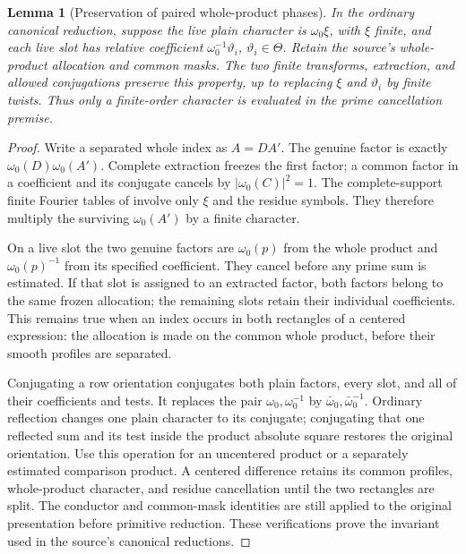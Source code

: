 \documentclass[11pt,a4paper]{article}
\numberwithin{equation}{section}
\newtheorem{lemma}[theorem]{Lemma}
\theoremstyle{definition}
\theoremstyle{remark}
\begin{document}
\begin{lemma}[Preservation of paired whole-product phases]\label{lem:paired-phase-invariant}
In the ordinary canonical reduction, suppose the live plain character
is $\omega_0\xi$, with $\xi$ finite, and each live slot has relative
coefficient $\omega_0^{-1}\vartheta_i$, $\vartheta_i\in\Theta$.
Retain the source's whole-product allocation and common masks.
The two finite transforms, extraction, and allowed conjugations
preserve this property, up to replacing $\xi$ and $\vartheta_i$ by
finite twists.  Thus only a finite-order character is evaluated in
the prime cancellation premise.
\end{lemma}
\begin{proof}
Write a separated whole index as $A=DA'$.  The genuine factor is
exactly $\omega_0(D)\omega_0(A')$.  Complete extraction freezes the
first factor; a common factor in a coefficient and its conjugate
cancels by $|\omega_0(C)|^2=1$.  The complete-support finite Fourier
tables of \cite[Lemma 18.2]{Q} involve only $\xi$ and the residue
symbols.  They therefore multiply the surviving $\omega_0(A')$ by a finite character.  

On a live slot the two genuine factors are
$\omega_0(p)$ from the whole product and $\omega_0(p)^{-1}$ from
its specified coefficient.  They cancel before any prime sum is
estimated.  If that slot is assigned to an extracted factor, both
factors belong to the same frozen allocation; the remaining slots
retain their individual coefficients.  This remains true when an
index occurs in both rectangles of a centered expression: the
allocation is made on the common whole product, before their
smooth profiles are separated.

Conjugating a row orientation conjugates both plain factors, every
slot, and all of their coefficients and tests.  It replaces the
pair $\omega_0,\omega_0^{-1}$ by
$\bar\omega_0,\bar\omega_0^{-1}$.
Ordinary reflection changes one plain character to its conjugate;
conjugating that one reflected sum and its test inside the product
absolute square restores the original orientation.  Use this operation for an uncentered product or a separately
estimated comparison product. A centered difference retains its
common profiles, whole-product character, and residue cancellation
until the two rectangles are split.  The conductor
and common-mask identities are still applied to the original
presentation before primitive reduction.  These verifications prove
the invariant used in the source's canonical reductions.
\end{proof}
\end{document}
